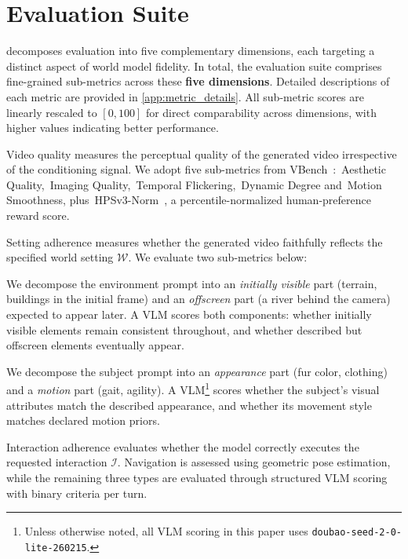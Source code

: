 \section{\benchmark Evaluation Suite}
\label{sec:evaluation_suite}


\benchmark decomposes evaluation into five complementary dimensions, each targeting a distinct aspect of world model fidelity.
In total, the evaluation suite comprises \numsubmetric fine-grained sub-metrics across these \textbf{five dimensions}. Detailed descriptions of each metric are provided in \cref{app:metric_details}.
All sub-metric scores are linearly rescaled to $[0, 100]$ for direct comparability across dimensions, with higher values indicating better performance.


\label{sec:d1_video_quality}
Video quality measures the perceptual quality of the generated video irrespective of the conditioning signal.
We adopt five sub-metrics from VBench~\cite{huang2024vbench}:
\,Aesthetic Quality,
\,Imaging Quality,
\,Temporal Flickering,
\,Dynamic Degree and
\,Motion Smoothness,
plus \,HPSv3-Norm~\cite{hpsv3}, a percentile-normalized human-preference reward score.

Setting adherence measures whether the generated video faithfully reflects the specified world setting $\mathcal{W}$.
We evaluate two sub-metrics below:

We decompose the environment prompt into an \emph{initially visible} part (\eg terrain, buildings in the initial frame) and an \emph{offscreen} part (\eg a river behind the camera) expected to appear later.
A VLM scores both components: whether initially visible elements remain consistent throughout, and whether described but offscreen elements eventually appear.

We decompose the subject prompt into an \emph{appearance} part (\eg fur color, clothing) and a \emph{motion} part (\eg gait, agility).
A VLM\footnote{Unless otherwise noted, all VLM scoring in this paper uses \texttt{doubao-seed-2-0-lite-260215}.} scores whether the subject's visual attributes match the described appearance, and whether its movement style matches declared motion priors.


Interaction adherence evaluates whether the model correctly executes the requested interaction $\mathcal{I}$.
Navigation is assessed using geometric pose estimation, while the remaining three types are evaluated through structured VLM scoring with binary criteria per turn.

